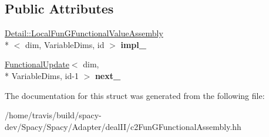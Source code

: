 \subsection*{Public Attributes}
\begin{DoxyCompactItemize}
\item 
\hypertarget{structSpacy_1_1dealII_1_1Detail_1_1FunctionalUpdate_a17984953c116ffca56b7dbbbed2fb1ef}{\hyperlink{structSpacy_1_1dealII_1_1Detail_1_1LocalFunGFunctionalValueAssembly}{Detail\-::\-Local\-Fun\-G\-Functional\-Value\-Assembly}\\*
$<$ dim, Variable\-Dims, id $>$ {\bfseries impl\-\_\-}}\label{structSpacy_1_1dealII_1_1Detail_1_1FunctionalUpdate_a17984953c116ffca56b7dbbbed2fb1ef}

\item 
\hypertarget{structSpacy_1_1dealII_1_1Detail_1_1FunctionalUpdate_a91c4b680dd99989d65d39db564ae18d3}{\hyperlink{structSpacy_1_1dealII_1_1Detail_1_1FunctionalUpdate}{Functional\-Update}$<$ dim, \\*
Variable\-Dims, id-\/1 $>$ {\bfseries next\-\_\-}}\label{structSpacy_1_1dealII_1_1Detail_1_1FunctionalUpdate_a91c4b680dd99989d65d39db564ae18d3}

\end{DoxyCompactItemize}


The documentation for this struct was generated from the following file\-:\begin{DoxyCompactItemize}
\item 
/home/travis/build/spacy-\/dev/\-Spacy/\-Spacy/\-Adapter/deal\-I\-I/c2\-Fun\-G\-Functional\-Assembly.\-hh\end{DoxyCompactItemize}
